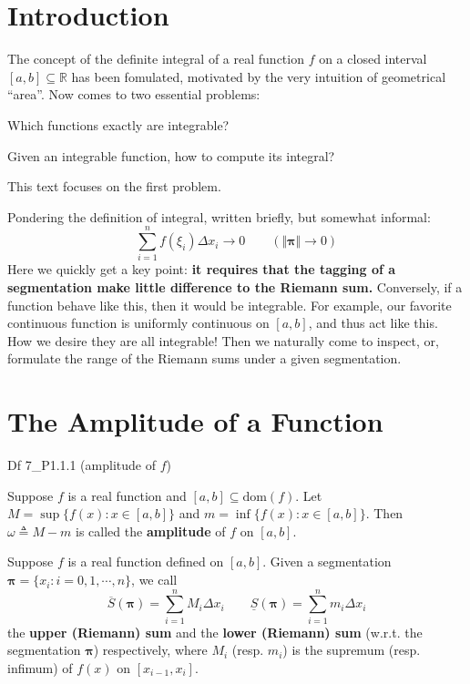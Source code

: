 \documentclass{article}
\begin{document}
\section{Introduction}
The concept of the definite integral of a real function $f$ on a closed interval $[a,b]\subseteq\mathbb{R}$ has been fomulated, motivated by the very intuition of geometrical ``area''. Now comes to two essential problems: 

\begin{compactenum}
    \item Which functions exactly are integrable?
    \item Given an integrable function, how to compute its integral?
\end{compactenum}

This text focuses on the first problem. 

Pondering the definition of integral, written briefly, but somewhat informal:
$$ \sum_{i=1}^{n} f(\xi_i)\Delta x_i \rightarrow 0 \qquad (\Vert\pmb{\pi}\Vert\rightarrow 0) $$
Here we quickly get a key point: \textbf{it requires that the tagging of a segmentation make little difference to the Riemann sum.} Conversely, if a function behave like this, then it would be integrable. For example, our favorite continuous function is uniformly continuous on $[a,b]$, and thus act like this. How we desire they are all integrable! Then we naturally come to inspect, or, formulate the range of the Riemann sums under a given segmentation.

\section{The Amplitude of a Function}

\begin{Df}{Df 7\_P1.1.1 (amplitude of $f$)}
    \begin{compactenum}
        \item Suppose $f$ is a real function and $[a,b]\subseteq\text{dom}(f)$. Let $M = \sup \{f(x): x\in [a,b]\}$ and $m = \inf \{f(x): x\in [a,b]\}$. Then $\omega \triangleq M-m$ is called the \textbf{amplitude} of $f$ on $[a,b]$.
        \item Suppose $f$ is a real function defined on $[a,b]$. Given a segmentation $\pmb{\pi} = \{x_i: i = 0,1,\cdots,n\}$, we call 
        $$ \overline{S}(\pmb{\pi}) = \sum_{i=1}^{n} M_i\Delta x_i \qquad \underline{S}(\pmb{\pi}) = \sum_{i=1}^{n} m_i\Delta x_i $$
        the \textbf{upper (Riemann) sum} and the \textbf{lower (Riemann) sum} (w.r.t. the segmentation $\pmb{\pi}$) respectively, where $M_i$ (resp. $m_i$) is the supremum (resp. infimum) of $f(x)$ on $[x_{i-1}, x_i]$.
    \end{compactenum}
\end{Df}
\end{document}
